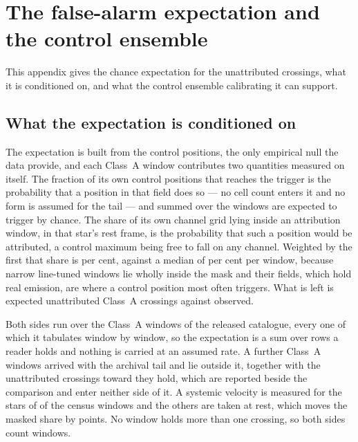 \section{The false-alarm expectation and the control ensemble}
\label{app:falsealarm}

This appendix gives the chance expectation for the unattributed crossings,
what it is conditioned on, and what the control ensemble calibrating it can
support.

\subsection{What the expectation is conditioned on}

The expectation is built from the control positions, the only empirical null
the data provide, and each Class~A window contributes two quantities
measured on itself. The fraction of its own \NCtrl{} control positions that
reaches the trigger is the probability that a position in that field does so
--- no cell count enters it and no form is assumed for the tail --- and
summed over the windows \CeExpTrig{} are expected to trigger by chance. The
share of its own channel grid lying inside an attribution window, in that
star's rest frame, is the probability that such a position would be
attributed, a control maximum being free to fall on any channel. Weighted by
the first that share is \CeMaskPct{} per cent, against a median of
\CeMaskPctMed{} per cent per window, because \CeNFullMask{} narrow
line-tuned windows lie wholly inside the mask and their fields, which hold
real emission, are where a control position most often triggers. What is
left is \CeExp{} expected unattributed Class~A crossings against \CeObs{}
observed.

Both sides run over the \CeNWin{} Class~A windows of the released catalogue,
every one of which it tabulates window by window, so the expectation is a
sum over rows a reader holds and nothing is carried at an assumed rate. A
further \CeNWinTail{} Class~A windows arrived with the archival tail and lie
outside it, together with the \CeNTailCrossWord{} unattributed crossings
toward \CeTailStar{} they hold, which are reported beside the comparison and
enter neither side of it. A systemic velocity is measured for the stars of
\CeNVsys{} of the census windows and the others are taken at rest, which
moves the masked share by \CeVsysSensPct{} points. No window holds more than
one crossing, so both sides count windows.

